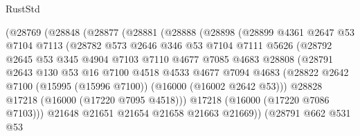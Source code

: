 \begin{lexlean}{RustStd}
\begin{coremodule}
                  (@28769
                    (@28848
                      (@28877
                        (@28881
                          (@28888
                            (@28898
                              (@28899
                                @4361
                                @2647
                                @53
                                @7104
                                @7113
                                (@28782
                                  @573
                                  @2646
                                  @346
                                  @53
                                  @7104
                                  @7111
                                  @5626
                                  (@28792
                                    @2645
                                    @53
                                    @345
                                    @4904
                                    @7103
                                    @7110
                                    @4677
                                    @7085
                                    @4683
                                    @28808
                                    (@28791
                                      @2643
                                      @130
                                      @53
                                      @16
                                      @7100
                                      @4518
                                      @4533
                                      @4677
                                      @7094
                                      @4683
                                      (@28822
                                        @2642
                                        @7100
                                        (@15995 (@15996 @7100))
                                        (@16000 (@16002 @2642 @53)))
                                      @28828
                                      @17218
                                      (@16000 (@17220 @7095 @4518)))
                                    @17218
                                    (@16000 (@17220 @7086 @7103)))
                                  @21648
                                  @21651
                                  @21654
                                  @21658
                                  @21663
                                  @21669))
                              (@28791
                                @662
                                @531
                                @53

\end{coremodule}
\end{lexlean}
